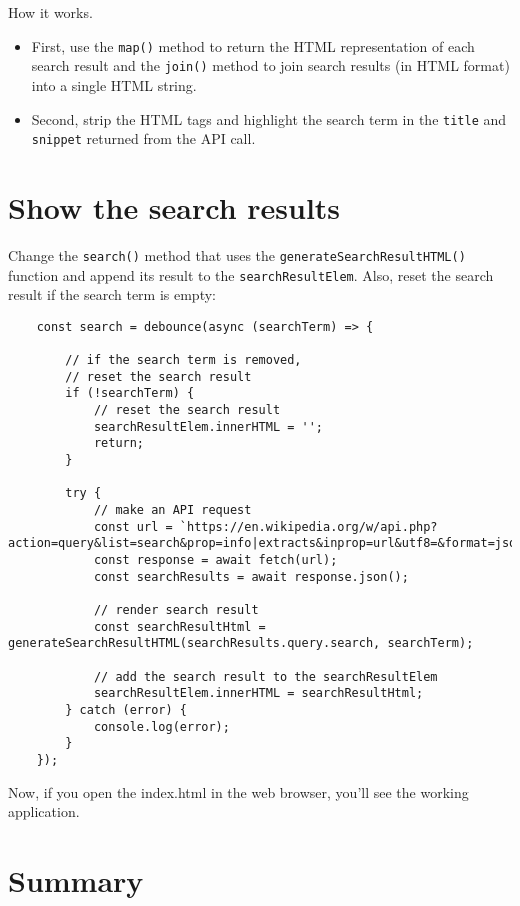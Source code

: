 \documentclass[11pt]{article}
\begin{document}
\noindent
How it works.

\begin{itemize}
\item First, use the \verb|map()| method to return the HTML representation of each
search result and the \verb|join()| method to join search results
(in HTML format) into a single HTML string.
\item Second, strip the HTML tags and highlight the search term in
the \verb|title| and \verb|snippet| returned from the API call.
\end{itemize}
\section*{Show the search results}

Change the \verb|search()| method that uses the \verb|generateSearchResultHTML()|
function and append its result to the \verb|searchResultElem|.
Also, reset the search result if the search term is empty:

\begin{lstlisting}
    const search = debounce(async (searchTerm) => {

        // if the search term is removed, 
        // reset the search result
        if (!searchTerm) {
            // reset the search result
            searchResultElem.innerHTML = '';
            return;
        }

        try {
            // make an API request
            const url = `https://en.wikipedia.org/w/api.php?action=query&list=search&prop=info|extracts&inprop=url&utf8=&format=json&origin=*&srlimit=10&srsearch=${searchTerm}`;
            const response = await fetch(url);
            const searchResults = await response.json();

            // render search result
            const searchResultHtml = generateSearchResultHTML(searchResults.query.search, searchTerm);

            // add the search result to the searchResultElem
            searchResultElem.innerHTML = searchResultHtml;
        } catch (error) {
            console.log(error);
        }
    });
\end{lstlisting}

\noindent
Now, if you open the index.html in the web browser, you'll see the
working application.

\section*{Summary}
\end{document}
